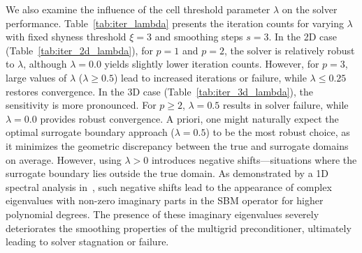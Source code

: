 \documentclass{elsarticle}
\begin{document}
We also examine the influence of the cell threshold parameter $\lambda$ on the solver performance.
Table~\ref{tab:iter_lambda} presents the iteration counts for varying $\lambda$ with fixed shyness threshold $\xi=3$
and smoothing steps $s=3$. In the 2D case (Table~\ref{tab:iter_2d_lambda}), for $p=1$ and $p=2$, the solver is
relatively robust to $\lambda$, although $\lambda=0.0$ yields slightly lower iteration counts. However, for $p=3$,
large values of $\lambda$ ($\lambda \ge 0.5$) lead to increased iterations or failure, while $\lambda \le 0.25$
restores convergence. In the 3D case (Table~\ref{tab:iter_3d_lambda}), the sensitivity is more pronounced. For $p \ge
    2$, $\lambda=0.5$ results in solver failure, while $\lambda=0.0$ provides robust convergence. A priori, one might
naturally expect the optimal surrogate boundary approach ($\lambda=0.5$) to be the most robust choice, as it minimizes
the geometric discrepancy between the true and surrogate domains on average. However, using $\lambda > 0$ introduces
negative shifts---situations where the surrogate boundary lies outside the true domain. As demonstrated by a 1D
spectral analysis in~\cite{wichrowski2025geometric}, such negative shifts lead to the appearance of complex eigenvalues
with non-zero imaginary parts in the SBM operator for higher polynomial degrees. The presence of these imaginary
eigenvalues severely deteriorates the smoothing properties of the multigrid preconditioner, ultimately leading to
solver stagnation or failure.
\end{document}
